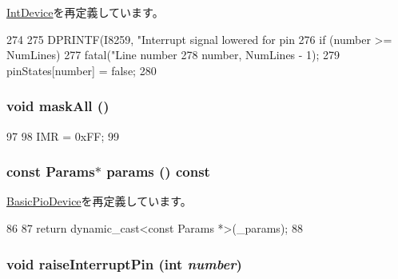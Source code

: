 \hyperlink{classX86ISA_1_1IntDevice_a1909001c0927e6a93d8bebf9d30bc11c}{IntDevice}を再定義しています。


\begin{DoxyCode}
274 {
275     DPRINTF(I8259, "Interrupt signal lowered for pin %
276     if (number >= NumLines)
277         fatal("Line number %
278                 number, NumLines - 1);
279     pinStates[number] = false;
280 }
\end{DoxyCode}
\hypertarget{classX86ISA_1_1I8259_ae0783eb10ff8764efd2be0ef4adac66b}{
\subsubsection[{maskAll}]{\setlength{\rightskip}{0pt plus 5cm}void maskAll ()}}
\label{classX86ISA_1_1I8259_ae0783eb10ff8764efd2be0ef4adac66b}



\begin{DoxyCode}
97     {
98         IMR = 0xFF;
99     }
\end{DoxyCode}
\hypertarget{classX86ISA_1_1I8259_acd3c3feb78ae7a8f88fe0f110a718dff}{
\subsubsection[{params}]{\setlength{\rightskip}{0pt plus 5cm}const {\bf Params}$\ast$ params () const}}
\label{classX86ISA_1_1I8259_acd3c3feb78ae7a8f88fe0f110a718dff}


\hyperlink{classBasicPioDevice_acd3c3feb78ae7a8f88fe0f110a718dff}{BasicPioDevice}を再定義しています。


\begin{DoxyCode}
86     {
87         return dynamic_cast<const Params *>(_params);
88     }
\end{DoxyCode}
\hypertarget{classX86ISA_1_1I8259_ac26dfa4264d910f3ef50015beafea211}{
\subsubsection[{raiseInterruptPin}]{\setlength{\rightskip}{0pt plus 5cm}void raiseInterruptPin (int {\em number})}}
\label{classX86ISA_1_1I8259_ac26dfa4264d910f3ef50015beafea211}


